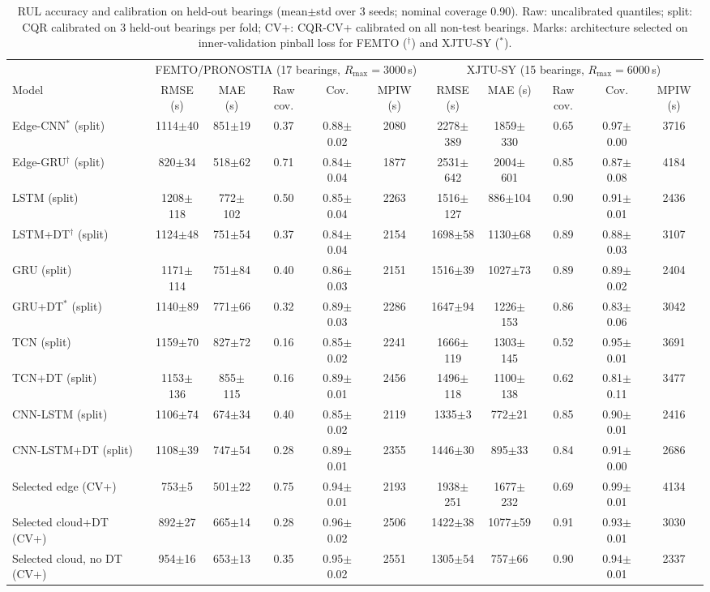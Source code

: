 \begin{table}[t]
\centering
\caption{RUL accuracy and calibration on held-out bearings (mean$\pm$std over 3 seeds; nominal coverage 0.90). Raw: uncalibrated quantiles; split: CQR calibrated on 3 held-out bearings per fold; CV+: CQR-CV+ calibrated on all non-test bearings. Marks: architecture selected on inner-validation pinball loss for FEMTO ($^\dagger$) and XJTU-SY ($^\ast$).}
\label{tab:rul}
\setlength{\tabcolsep}{3.2pt}\footnotesize
\begin{tabular}{l|ccccc|ccccc}
\toprule
 & \multicolumn{5}{c|}{FEMTO/PRONOSTIA (17 bearings, $R_{\max}{=}3000$\,s)} & \multicolumn{5}{c}{XJTU-SY (15 bearings, $R_{\max}{=}6000$\,s)} \\
Model & RMSE (s) & MAE (s) & Raw cov. & Cov. & MPIW (s) & RMSE (s) & MAE (s) & Raw cov. & Cov. & MPIW (s) \\
\midrule
Edge-CNN$^\ast$ (split) & 1114$\pm$40 & 851$\pm$19 & 0.37 & 0.88$\pm$0.02 & 2080 & 2278$\pm$389 & 1859$\pm$330 & 0.65 & 0.97$\pm$0.00 & 3716 \\
Edge-GRU$^\dagger$ (split) & 820$\pm$34 & 518$\pm$62 & 0.71 & 0.84$\pm$0.04 & 1877 & 2531$\pm$642 & 2004$\pm$601 & 0.85 & 0.87$\pm$0.08 & 4184 \\
\midrule
LSTM (split) & 1208$\pm$118 & 772$\pm$102 & 0.50 & 0.85$\pm$0.04 & 2263 & 1516$\pm$127 & 886$\pm$104 & 0.90 & 0.91$\pm$0.01 & 2436 \\
LSTM+DT$^\dagger$ (split) & 1124$\pm$48 & 751$\pm$54 & 0.37 & 0.84$\pm$0.04 & 2154 & 1698$\pm$58 & 1130$\pm$68 & 0.89 & 0.88$\pm$0.03 & 3107 \\
GRU (split) & 1171$\pm$114 & 751$\pm$84 & 0.40 & 0.86$\pm$0.03 & 2151 & 1516$\pm$39 & 1027$\pm$73 & 0.89 & 0.89$\pm$0.02 & 2404 \\
GRU+DT$^\ast$ (split) & 1140$\pm$89 & 771$\pm$66 & 0.32 & 0.89$\pm$0.03 & 2286 & 1647$\pm$94 & 1226$\pm$153 & 0.86 & 0.83$\pm$0.06 & 3042 \\
TCN (split) & 1159$\pm$70 & 827$\pm$72 & 0.16 & 0.85$\pm$0.02 & 2241 & 1666$\pm$119 & 1303$\pm$145 & 0.52 & 0.95$\pm$0.01 & 3691 \\
TCN+DT (split) & 1153$\pm$136 & 855$\pm$115 & 0.16 & 0.89$\pm$0.01 & 2456 & 1496$\pm$118 & 1100$\pm$138 & 0.62 & 0.81$\pm$0.11 & 3477 \\
CNN-LSTM (split) & 1106$\pm$74 & 674$\pm$34 & 0.40 & 0.85$\pm$0.02 & 2119 & 1335$\pm$3 & 772$\pm$21 & 0.85 & 0.90$\pm$0.01 & 2416 \\
CNN-LSTM+DT (split) & 1108$\pm$39 & 747$\pm$54 & 0.28 & 0.89$\pm$0.01 & 2355 & 1446$\pm$30 & 895$\pm$33 & 0.84 & 0.91$\pm$0.00 & 2686 \\
\midrule
Selected edge (CV+) & 753$\pm$5 & 501$\pm$22 & 0.75 & 0.94$\pm$0.01 & 2193 & 1938$\pm$251 & 1677$\pm$232 & 0.69 & 0.99$\pm$0.01 & 4134 \\
Selected cloud+DT (CV+) & 892$\pm$27 & 665$\pm$14 & 0.28 & 0.96$\pm$0.02 & 2506 & 1422$\pm$38 & 1077$\pm$59 & 0.91 & 0.93$\pm$0.01 & 3030 \\
Selected cloud, no DT (CV+) & 954$\pm$16 & 653$\pm$13 & 0.35 & 0.95$\pm$0.02 & 2551 & 1305$\pm$54 & 757$\pm$66 & 0.90 & 0.94$\pm$0.01 & 2337 \\
\bottomrule
\end{tabular}
\end{table}

